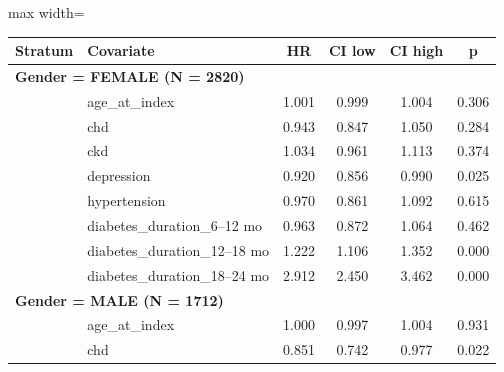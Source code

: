 \documentclass[twoside,11pt]{article}
\begin{document}
\begin{table}[H]
  \centering
  \begin{adjustbox}{max width=\textwidth}
    \begin{tabular}{llcccc}
      \hline
      \textbf{Stratum} & \textbf{Covariate}            & \textbf{HR} & \textbf{CI low} & \textbf{CI high} & \textbf{p}                  \\
      \hline
      \multicolumn{6}{l}{\textbf{Gender = FEMALE (N = 2820)}}                                                                           \\
      \hline
                       & age\_at\_index                & 1.001       & 0.999           & 1.004            & 0.306                       \\
                       & chd                           & 0.943       & 0.847           & 1.050            & 0.284                       \\
                       & ckd                           & 1.034       & 0.961           & 1.113            & 0.374                       \\
                       & depression                    & 0.920       & 0.856           & 0.990            & \cellcolor{lightgreen}0.025 \\
                       & hypertension                  & 0.970       & 0.861           & 1.092            & 0.615                       \\
                       & diabetes\_duration\_6--12 mo  & 0.963       & 0.872           & 1.064            & 0.462                       \\
                       & diabetes\_duration\_12--18 mo & 1.222       & 1.106           & 1.352            & \cellcolor{lightgreen}0.000 \\
                       & diabetes\_duration\_18--24 mo & 2.912       & 2.450           & 3.462            & \cellcolor{lightgreen}0.000 \\
      \hline
      \multicolumn{6}{l}{\textbf{Gender = MALE (N = 1712)}}                                                                             \\
      \hline
                       & age\_at\_index                & 1.000       & 0.997           & 1.004            & 0.931                       \\
                       & chd                           & 0.851       & 0.742           & 0.977            & \cellcolor{lightgreen}0.022 \\

\end{tabular}
\end{adjustbox}
\end{table}
\end{document}
